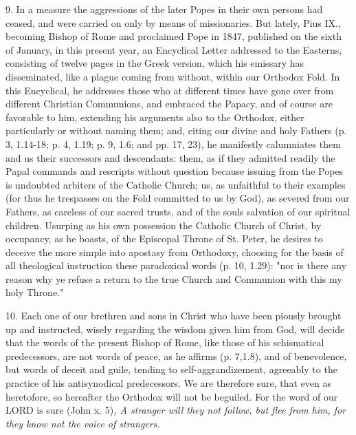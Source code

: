 9. In a measure the aggressions of the later Popes in their own persons
had ceased, and were carried on only by means of missionaries. But
lately, Pius IX., becoming Bishop of Rome and proclaimed Pope in 1847,
published on the sixth of January, in this present year, an Encyclical
Letter addressed to the Easterns, consisting of twelve pages in the
Greek version, which his emissary has disseminated, like a plague coming
from without, within our Orthodox Fold. In this Encyclical, he addresses
those who at different times have gone over from different Christian
Communions, and embraced the Papacy, and of course are favorable to him,
extending his arguments also to the Orthodox, either particularly or
without naming them; and, citing our divine and holy Fathers (p. 3,
1.14-18; p. 4, 1.19; p. 9, 1.6; and pp. 17, 23), he manifestly
calumniates them and us their successors and descendants: them, as if
they admitted readily the Papal commands and rescripts without question
because issuing from the Popes is undoubted arbiters of the Catholic
Church; us, as unfaithful to their examples (for thus he trespasses on
the Fold committed to us by God), as severed from our Fathers, as
careless of our sacred trusts, and of the soul\textquotesingle s
salvation of our spiritual children. Usurping as his own possession the
Catholic Church of Christ, by occupancy, as he boasts, of the Episcopal
Throne of St. Peter, he desires to deceive the more simple into apostasy
from Orthodoxy, choosing for the basis of all theological instruction
these paradoxical words (p. 10, 1.29): "nor is there any reason why ye
refuse a return to the true Church and Communion with this my holy
Throne."

10. Each one of our brethren and sons in Christ who have been piously
brought up and instructed, wisely regarding the wisdom given him from
God, will decide that the words of the present Bishop of Rome, like
those of his schismatical predecessors, are not words of peace, as he
affirms (p. 7,1.8), and of benevolence, but words of deceit and guile,
tending to self-aggrandizement, agreeably to the practice of his
antisynodical predecessors. We are therefore sure, that even as
heretofore, so hereafter the Orthodox will not be beguiled. For the word
of our LORD is sure (John x. 5)\emph{, A stranger will they not follow,
but flee from him, for they know not the voice of strangers.}

